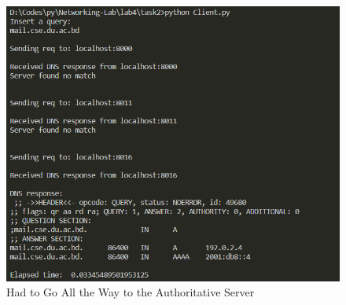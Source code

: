 \documentclass[11pt]{article}
\begin{document}
            \begin{figure}[!h]
                \centering
                \includegraphics*[width=\textwidth]{task2_client_back_from_auth.png}
                \caption{Had to Go All the Way to the Authoritative Server}
            \end{figure}
        \FloatBarrier
\newpage
            
\end{document}
